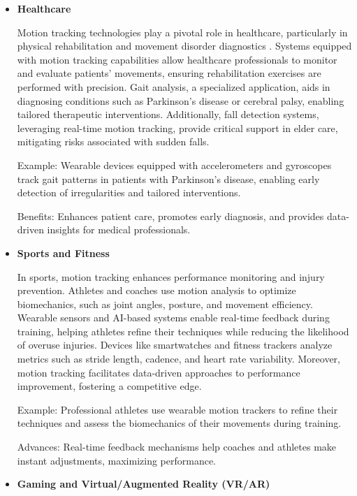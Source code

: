 \begin{itemize}
    \item \textbf{Healthcare}
    
    Motion tracking technologies play a pivotal role in healthcare, particularly in physical rehabilitation and movement disorder diagnostics \cite{article:motion_tracking_using_AI}. Systems equipped with motion tracking capabilities allow healthcare professionals to monitor and evaluate patients' movements, ensuring rehabilitation exercises are performed with precision. Gait analysis, a specialized application, aids in diagnosing conditions such as Parkinson’s disease or cerebral palsy, enabling tailored therapeutic interventions. Additionally, fall detection systems, leveraging real-time motion tracking, provide critical support in elder care, mitigating risks associated with sudden falls.

    Example: Wearable devices equipped with accelerometers and gyroscopes track gait patterns in patients with Parkinson’s disease, enabling early detection of irregularities and tailored interventions.

    Benefits: Enhances patient care, promotes early diagnosis, and provides data-driven insights for medical professionals.

    \item \textbf{Sports and Fitness}
    
    In sports, motion tracking enhances performance monitoring and injury prevention. Athletes and coaches use motion analysis to optimize biomechanics, such as joint angles, posture, and movement efficiency. Wearable sensors and AI-based systems enable real-time feedback during training, helping athletes refine their techniques while reducing the likelihood of overuse injuries. Devices like smartwatches and fitness trackers analyze metrics such as stride length, cadence, and heart rate variability. Moreover, motion tracking facilitates data-driven approaches to performance improvement, fostering a competitive edge.
    
    Example: Professional athletes use wearable motion trackers to refine their techniques and assess the biomechanics of their movements during training.
    
    Advances: Real-time feedback mechanisms help coaches and athletes make instant adjustments, maximizing performance.

    \item \textbf{Gaming and Virtual/Augmented Reality (VR/AR)}
    

\end{itemize}
